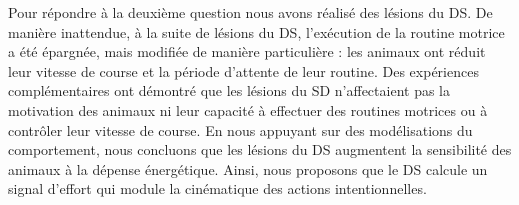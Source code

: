 Pour répondre à la deuxième question nous avons réalisé des lésions du DS.
De manière inattendue, à la suite de lésions du DS, l'exécution de la routine motrice a été épargnée, mais modifiée de manière particulière : 
    les animaux ont réduit leur vitesse de course et la période d'attente de leur routine.
Des expériences complémentaires ont démontré que les lésions du SD n'affectaient pas la motivation des animaux ni leur capacité à effectuer des routines motrices ou à contrôler leur vitesse de course.
En nous appuyant sur des modélisations du comportement, nous concluons que les lésions du DS augmentent la sensibilité des animaux à la dépense énergétique.
Ainsi, nous proposons que le DS calcule un signal d'effort qui module la cinématique des actions intentionnelles.
